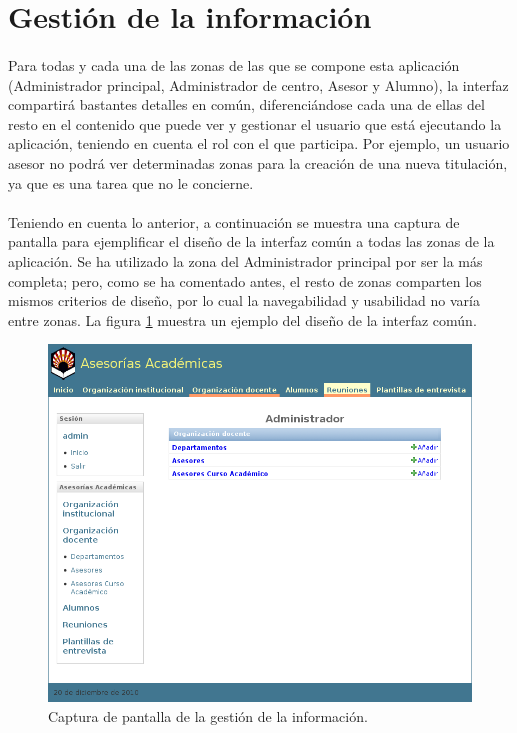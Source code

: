 \section{Gestión de la información}

  \paragraph{}Para todas y cada una de las zonas de las que se compone esta
  aplicación (Administrador principal, Administrador de centro, Asesor y
  Alumno), la interfaz compartirá bastantes detalles en común, diferenciándose
  cada una de ellas del resto en el contenido que puede ver y gestionar el
  usuario que está ejecutando la aplicación, teniendo en cuenta el rol con el
  que participa. Por ejemplo, un usuario asesor no podrá ver determinadas zonas
  para la creación de una nueva titulación, ya que es una tarea que no le
  concierne.

  \paragraph{}Teniendo en cuenta lo anterior, a continuación se muestra una
  captura de pantalla para ejemplificar el diseño de la interfaz común a todas
  las zonas de la aplicación. Se ha utilizado la zona del Administrador
  principal por ser la más completa; pero, como se ha comentado antes, el resto
  de zonas comparten los mismos criterios de diseño, por lo cual la
  navegabilidad y usabilidad no varía entre zonas. La figura
  \ref{capturaGestionInformacion} muestra un ejemplo del diseño de la interfaz
  común.

  \begin{figure}[!ht]
    \begin{center}
      \includegraphics[scale=0.5]{12.Disenyo_Interfaz/12.3.Gestion_Informacion/gestion_informacion.png}
      \caption{Captura de pantalla de la gestión de la información.}
      \label{capturaGestionInformacion}
    \end{center}
  \end{figure}
